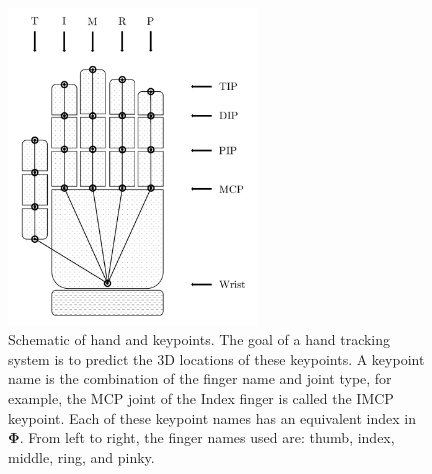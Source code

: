 \begin{figure}[h]
    \renewcommand\thefigure{0.2}
    \centering
    \includegraphics[width=250px]{figs/general/hand_schematic.pdf}
    \caption{Schematic of hand and keypoints. The goal of a hand tracking system is to predict the 3D locations of these keypoints. A keypoint name is the combination of the finger name and joint type, for example, the MCP joint of the Index finger is called the IMCP keypoint. Each of these keypoint names has an equivalent index in $\bm{\Phi}$. From left to right, the finger names used are: thumb, index, middle, ring, and pinky.}
    \label{fig:sd:hand}
    \end{figure}

\vspace{2cm}




